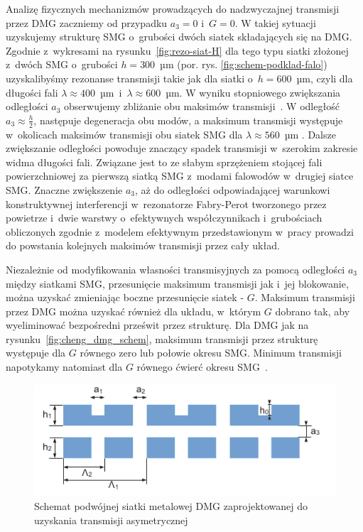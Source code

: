 Analizę fizycznych mechanizmów prowadzących do nadzwyczajnej transmisji przez DMG zaczniemy od przypadku $a_3=0$ i~$G=0$. W takiej sytuacji uzyskujemy strukturę SMG o~grubości dwóch siatek składających się na DMG. Zgodnie z~wykresami na rysunku~\ref{fig:rezo-siat-H} dla tego typu siatki złożonej z~dwóch SMG o~grubości $h=300$~µm (por. rys. \ref{fig:schem-podklad-falo}) uzyskalibyśmy rezonanse transmisji takie jak dla siatki o~$h=600$~µm, czyli dla długości fali $\lambda \approx 400$~µm~i~$\lambda \approx 600$~µm. W wyniku stopniowego zwiększania odległości $a_3$ obserwujemy zbliżanie obu maksimów transmisji~\cite{cheng2008physical}. W odległość $a_3 \approx \frac{h}{2}$, następuje degeneracja obu modów, a maksimum transmisji występuje w~okolicach maksimów transmisji obu siatek SMG dla $\lambda \approx 560$~µm \cite{cheng2008physical}. Dalsze zwiększanie odległości powoduje znaczący spadek transmisji w~szerokim zakresie widma długości fali. Związane jest to ze słabym sprzężeniem stojącej fali powierzchniowej za pierwszą siatką SMG z~modami falowodów w~drugiej siatce SMG. Znaczne zwiększenie $a_3$, aż do odległości odpowiadającej warunkowi konstruktywnej interferencji w~rezonatorze Fabry-Perot tworzonego przez powietrze i~dwie warstwy o~efektywnych współczynnikach i~grubościach obliczonych zgodnie z~modelem efektywnym przedstawionym w~pracy \cite{shen2005mechanism} prowadzi do powstania kolejnych maksimów transmisji przez cały układ.

Niezależnie od modyfikowania własności transmisyjnych za pomocą odległości $a_3$ między siatkami SMG, przesunięcie maksimum transmisji jak i~jej blokowanie, można uzyskać zmieniając boczne przesunięcie siatek - $G$. Maksimum transmisji przez DMG można uzyskać również dla układu, w~którym $G$ dobrano tak, aby wyeliminować bezpośredni prześwit przez strukturę. Dla DMG jak na rysunku~\ref{fig:cheng_dmg_schem}, maksimum transmisji przez strukturę występuje dla $G$ równego zero lub połowie okresu SMG. Minimum transmisji napotykamy natomiast dla $G$ równego ćwierć okresu SMG~\cite{chan2006optical}.

\begin{figure}[tb]
	\includegraphics[width=\textwidth]{images/thz/1D-DMG-schemat.png}
	\caption{Schemat podwójnej siatki metalowej DMG zaprojektowanej do uzyskania transmisji asymetrycznej}
	\label{fig:1ddmg-schem}
\end{figure}


